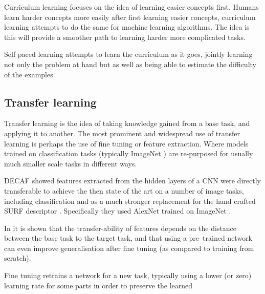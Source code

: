 Curriculum learning focuses on the idea of learning easier concepts first. Humans learn harder concepts more easily after first learning easier concepts, curriculum learning attempts to do the same for machine learning algorithms. The idea is this will provide a smoother path to learning harder more complicated tasks. \cite{TODO}

Self paced learning \cite{Kumar2010} attempts to learn the curriculum as it goes, jointly learning not only the problem at hand but  as well as being able to estimate the difficulty of the examples.






\subsection {Transfer learning}

Transfer learning is the idea of taking knowledge gained from a base task, and applying it to another. The most prominent and widespread use of transfer learning is perhaps the use of fine tuning or feature extraction.  Where models trained on classification tasks (typically ImageNet \cite{JiaDeng2009}) are re-purposed for usually much smaller scale tasks in different ways. 

\gls{DECAF} \cite{Donahue2014} showed features extracted from the hidden layers of a \gls{CNN} were directly transferable to achieve the then state of the art on a number of image tasks, including classification and as a much stronger replacement for the hand crafted \gls{SURF} descriptor \cite{bay2006surf}.  Specifically they used AlexNet  \cite{Krizhevsky2012} trained on ImageNet \cite{JiaDeng2009}.

In \cite{Yosinski} it is shown that the transfer-ability of features depends on the distance between the base task to the target task, and that using a pre--trained network can even improve generalisation after fine tuning (as compared to training from scratch).

Fine tuning retrains a network for a new task, typically using a lower (or zero) learning rate for some parts in order to preserve the learned 

